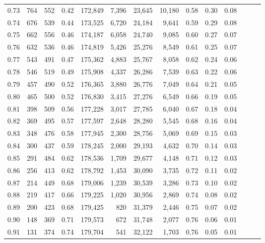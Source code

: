 \begin{tabular}{rrrrrrrrrrrrrr}
0.73 &    764 &  552 &  0.42 &  172,849 &    7,396 &  23,645 &  10,180 &  0.58 &  0.30 &      0.08 \\
0.74 &    676 &  539 &  0.44 &  173,525 &    6,720 &  24,184 &   9,641 &  0.59 &  0.29 &      0.08 \\
0.75 &    662 &  556 &  0.46 &  174,187 &    6,058 &  24,740 &   9,085 &  0.60 &  0.27 &      0.07 \\
0.76 &    632 &  536 &  0.46 &  174,819 &    5,426 &  25,276 &   8,549 &  0.61 &  0.25 &      0.07 \\
0.77 &    543 &  491 &  0.47 &  175,362 &    4,883 &  25,767 &   8,058 &  0.62 &  0.24 &      0.06 \\
0.78 &    546 &  519 &  0.49 &  175,908 &    4,337 &  26,286 &   7,539 &  0.63 &  0.22 &      0.06 \\
0.79 &    457 &  490 &  0.52 &  176,365 &    3,880 &  26,776 &   7,049 &  0.64 &  0.21 &      0.05 \\
0.80 &    465 &  500 &  0.52 &  176,830 &    3,415 &  27,276 &   6,549 &  0.66 &  0.19 &      0.05 \\
0.81 &    398 &  509 &  0.56 &  177,228 &    3,017 &  27,785 &   6,040 &  0.67 &  0.18 &      0.04 \\
0.82 &    369 &  495 &  0.57 &  177,597 &    2,648 &  28,280 &   5,545 &  0.68 &  0.16 &      0.04 \\
0.83 &    348 &  476 &  0.58 &  177,945 &    2,300 &  28,756 &   5,069 &  0.69 &  0.15 &      0.03 \\
0.84 &    300 &  437 &  0.59 &  178,245 &    2,000 &  29,193 &   4,632 &  0.70 &  0.14 &      0.03 \\
0.85 &    291 &  484 &  0.62 &  178,536 &    1,709 &  29,677 &   4,148 &  0.71 &  0.12 &      0.03 \\
0.86 &    256 &  413 &  0.62 &  178,792 &    1,453 &  30,090 &   3,735 &  0.72 &  0.11 &      0.02 \\
0.87 &    214 &  449 &  0.68 &  179,006 &    1,239 &  30,539 &   3,286 &  0.73 &  0.10 &      0.02 \\
0.88 &    219 &  417 &  0.66 &  179,225 &    1,020 &  30,956 &   2,869 &  0.74 &  0.08 &      0.02 \\
0.89 &    200 &  423 &  0.68 &  179,425 &      820 &  31,379 &   2,446 &  0.75 &  0.07 &      0.02 \\
0.90 &    148 &  369 &  0.71 &  179,573 &      672 &  31,748 &   2,077 &  0.76 &  0.06 &      0.01 \\
0.91 &    131 &  374 &  0.74 &  179,704 &      541 &  32,122 &   1,703 &  0.76 &  0.05 &      0.01 \\

\end{tabular}
